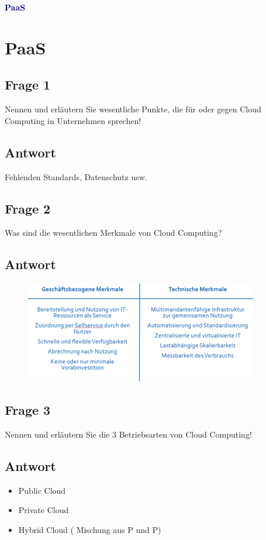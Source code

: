 \textbf{\textcolor{darkblue}{ PaaS}}~

\section*{PaaS}
\subsection*{Frage 1}
Nennen und erläutern Sie wesentliche Punkte, die für oder gegen Cloud Computing in Unternehmen sprechen!
\subsection*{Antwort}
Fehlenden Standards, Datenschutz usw.
\subsection*{Frage 2}
Was sind die wesentlichen Merkmale von Cloud Computing?
\subsection*{Antwort}
\begin{figure}
	\centering
	\includegraphics[width=0.7\linewidth]{screenshot003}
	\caption{}
	\label{fig:screenshot003}
\end{figure}

\subsection*{Frage 3}
Nennen und erläutern Sie die 3 Betriebsarten von Cloud Computing!
\subsection*{Antwort}
\begin{itemize}
	\item Public Cloud
	\item Private Cloud
	\item Hybrid Cloud ( Mischung aus P und P)
\end{itemize}
